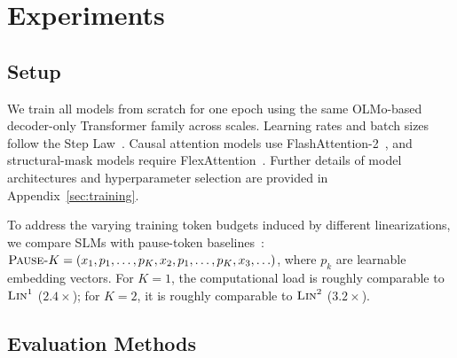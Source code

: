 \documentclass[11pt]{article}
\begin{document}
\section{Experiments}

\subsection{Setup}

We train all models from scratch for one epoch using the same OLMo-based~\cite{groeneveld-etal-2024-olmo} decoder-only Transformer family across scales. Learning rates and batch sizes follow the Step Law~\cite{li2025predictable}. Causal attention models use FlashAttention-2~\cite{dao2023flashattention2}, and structural-mask models require FlexAttention~\cite{dong2024flex}. Further details of model architectures and hyperparameter selection are provided in Appendix~\ref{sec:training}.

To address the varying training token budgets induced by different linearizations, we compare SLMs with pause-token baselines~\cite{goyal2024think}: $\textsc{Pause-}K = (x_1, p_1, \ldots, p_K, x_2, p_1, \ldots, p_K, x_3, \ldots)$, where $p_k$ are learnable embedding vectors. For $K=1$, the computational load is roughly comparable to $\textsc{Lin}^1$ ($2.4\times$); for $K=2$, it is roughly comparable to $\textsc{Lin}^2$ ($3.2\times$).

\subsection{Evaluation Methods}
\end{document}
